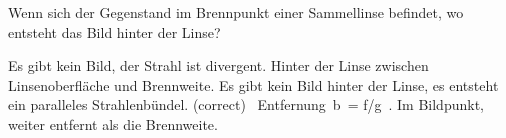 \documentclass[11pt]{exam}
\begin{document}
\begin{questions}
\vspace{3mm}\question Wenn sich der Gegenstand im Brennpunkt einer Sammellinse befindet, wo entsteht das Bild hinter der Linse?

\begin{choices}
	\choice Es gibt kein Bild, der Strahl ist divergent.
	\choice Hinter der Linse zwischen Linsenoberfläche und Brennweite.
	\choice Es gibt kein Bild hinter der Linse, es entsteht ein paralleles Strahlenbündel. (correct)
	\choice  Entfernung b = f/g .
	\choice Im Bildpunkt, weiter entfernt als die Brennweite.
\end{choices}

\vspace{3mm}\end{questions}
\end{document}
